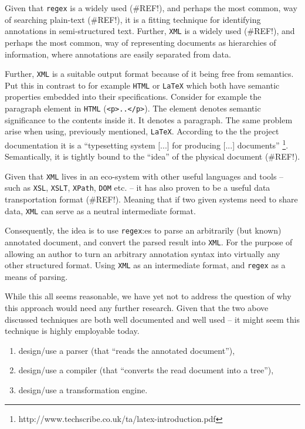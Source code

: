 \documentclass{scrreprt}
\begin{document}
Given that \texttt{regex} is a widely used (\#REF!), and perhaps the most common, way of searching plain-text (\#REF!), it is a fitting technique for identifying annotations in semi-structured text. Further, \texttt{XML} is a widely used (\#REF!), and perhaps the most common, way of representing documents as hierarchies of information, where annotations are easily separated from data.

Further, \texttt{XML} is a suitable output format because of it being free from semantics. Put this in contrast to for example \texttt{HTML} or \texttt{LaTeX} which both have semantic properties embedded into their specifications. Consider for example the paragraph element in \texttt{HTML} (\texttt{<p>..</p>}). The element denotes semantic significance to the contents inside it. It denotes a paragraph. The same problem arise when using, previously mentioned, \texttt{LaTeX}. According to the the project documentation it is a ``typesetting system [...] for producing [...] documents'' \footnote{ http://www.techscribe.co.uk/ta/latex-introduction.pdf}. Semantically, it is tightly bound to the ``idea'' of the physical document (\#REF!). 

Given that \texttt{XML} lives in an eco-system with other useful languages and tools -- such as \texttt{XSL}, \texttt{XSLT}, \texttt{XPath}, \texttt{DOM} etc. -- it has also proven to be a useful data transportation format (\#REF!). Meaning that if two given systems need to share data, \texttt{XML} can serve as a neutral intermediate format.

Consequently, the idea is to use \texttt{regex}:es to parse an arbitrarily (but known) annotated document, and convert the parsed result into \texttt{XML}. For the purpose of allowing an author to turn an arbitrary annotation syntax into virtually any other structured format. Using \texttt{XML} as an intermediate format, and \texttt{regex} as a means of parsing.

While this all seems reasonable, we have yet not to address the question of why this approach would need any further research. Given that the two above discussed techniques are both well documented and well used -- it might seem this technique is highly employable today.

\begin{enumerate}
\item design/use a parser (that ``reads the annotated document''),
\item design/use a compiler (that ``converts the read document into a tree''),
\item design/use a transformation engine.
\end{enumerate}
\end{document}
